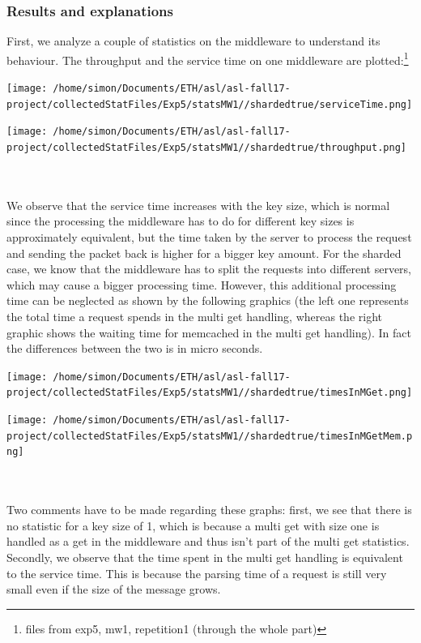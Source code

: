 \documentclass[11pt,a4paper]{article}
\begin{document}
\subsubsection{Results and explanations}
First, we analyze a couple of statistics on the middleware to understand its behaviour. The throughput and the service time on one middleware are plotted:\footnote{files from exp5, mw1, repetition1 (through the whole part)}
\\
\begin{minipage}{0.5\linewidth}
\texttt{[image: /home/simon/Documents/ETH/asl/asl-fall17-project/collectedStatFiles/Exp5/statsMW1//shardedtrue/serviceTime.png]}
\end{minipage}
\hfill
\begin{minipage}{0.5\linewidth}
\texttt{[image: /home/simon/Documents/ETH/asl/asl-fall17-project/collectedStatFiles/Exp5/statsMW1//shardedtrue/throughput.png]}
\end{minipage}
\\\\
We observe that the service time increases with the key size, which is normal since the processing the middleware has to do for different key sizes is approximately equivalent, but the time taken by the server to process the request and sending the packet back is higher for a bigger key amount. For the sharded case, we know that the middleware has to split the requests into different servers, which may cause a bigger processing time. However, this additional processing time can be neglected as shown by the following graphics (the left one represents the total time a request spends in the multi get handling, whereas the right graphic shows the waiting time for memcached in the multi get handling). In fact the differences between the two is in micro seconds. 
\\
\begin{minipage}{0.5\linewidth}
\texttt{[image: /home/simon/Documents/ETH/asl/asl-fall17-project/collectedStatFiles/Exp5/statsMW1//shardedtrue/timesInMGet.png]}
\end{minipage}
\hfill
\begin{minipage}{0.5\linewidth}
\texttt{[image: /home/simon/Documents/ETH/asl/asl-fall17-project/collectedStatFiles/Exp5/statsMW1//shardedtrue/timesInMGetMem.png]}
\end{minipage}
\\\\
Two comments have to be made regarding these graphs: first, we see that there is no statistic for a key size of 1, which is because a multi get with size one is handled as a get in the middleware and thus isn't part of the multi get statistics. Secondly, we observe that the time spent in the multi get handling is equivalent to the service time. This is because the parsing time of a request is still very small even if the size of the message grows.
\end{document}
